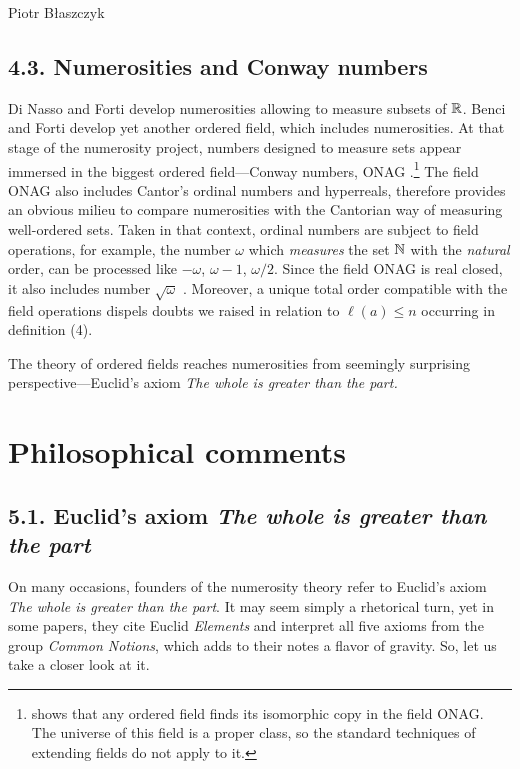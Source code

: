\begin{artengenv}{Piotr Błaszczyk}
\subsection{4.3. Numerosities and Conway numbers}
Di Nasso and Forti \parencite*{ref_DF10} develop numerosities allowing to measure subsets of ${\mathbb{R}}$. 
Benci and Forti \parencite*{ref_BF17} develop yet another ordered field, which includes numerosities. At that stage of the numerosity project, numbers designed to measure sets appear immersed in the biggest ordered field---Conway numbers, ONAG \parencite[see][21]{ref_BF17}.\footnote{\parencite{ref_pe} shows that any ordered field finds its isomorphic copy in the field ONAG. The universe of this field is a proper class, so the standard techniques of extending fields do not apply to it.}  The field ONAG also includes Cantor's ordinal numbers and hyperreals, therefore provides an obvious milieu to compare numerosities with the Cantorian way of measuring well-ordered sets. Taken in that context,  ordinal numbers are subject to field operations, for example, the number $\omega$ which \textit{measures} the set ${\mathbb{N}}$ with the \textit{natural} order, can be processed like $-\omega$, $\omega-1$, $\omega/2$. Since the field ONAG is real closed, it also includes number $\sqrt{\omega}$ \parencite[see][\S\,8]{ref_bf}. Moreover, a unique total order compatible with the field operations dispels doubts we raised in relation to $\ell (a)\leq n$ occurring in definition (4).

The theory of ordered fields reaches numerosities from seemingly surprising perspective---Euclid's axiom \textit{The whole is greater than the part.}   
\section{Philosophical comments}


\subsection{5.1. Euclid's axiom \textit{The whole is greater than the part}}


On many occasions, founders of the numerosity theory refer to Euclid's axiom \textit{The whole is greater than the part}. It may seem simply a rhetorical turn, yet in some papers, they cite Euclid \textit{Elements} and interpret all five axioms from the group \textit{Common Notions}, which adds to their notes a flavor of gravity.  So, let us take a closer look at it.


\end{artengenv}
